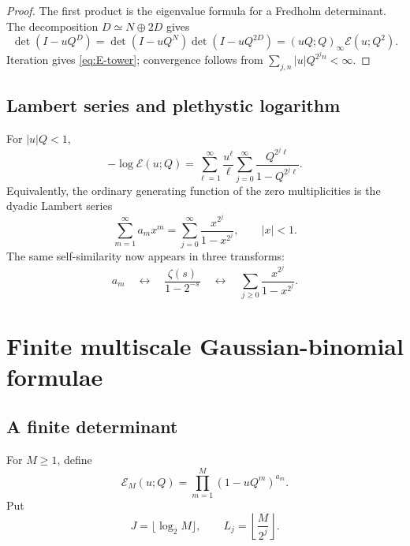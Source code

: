 \documentclass[11pt,oneside]{article}
\numberwithin{equation}{section}
\theoremstyle{plain}
\theoremstyle{definition}
\theoremstyle{remark}
\newcommand{\Ecal}{\mathscr E}
\begin{document}
\begin{proof}
The first product is the eigenvalue formula for a Fredholm determinant.  The decomposition $D\simeq N\oplus2D$ gives
\[
 \det(I-uQ^D)=\det(I-uQ^N)\det(I-uQ^{2D})
 =(uQ;Q)_\infty\Ecal(u;Q^2).
\]
Iteration gives \cref{eq:E-tower}; convergence follows from $\sum_{j,n}|u|Q^{2^jn}<\infty$.
\end{proof}

\subsection{Lambert series and plethystic logarithm}

For $|u|Q<1$,
\begin{equation}\label{eq:E-log}
 -\log\Ecal(u;Q)
 =\sum_{\ell=1}^{\infty}\frac{u^\ell}{\ell}
 \sum_{j=0}^{\infty}\frac{Q^{2^j\ell}}{1-Q^{2^j\ell}}.
\end{equation}
Equivalently, the ordinary generating function of the zero multiplicities is the dyadic Lambert series
\begin{equation}\label{eq:a-ogf}
 \boxed{\ \sum_{m=1}^{\infty}a_mx^m
 =\sum_{j=0}^{\infty}\frac{x^{2^j}}{1-x^{2^j}},\qquad |x|<1.\ }
\end{equation}
The same self-similarity now appears in three transforms:
\[
 a_m\quad\longleftrightarrow\quad
 \frac{\zeta(s)}{1-2^{-s}}
 \quad\longleftrightarrow\quad
 \sum_{j\ge0}\frac{x^{2^j}}{1-x^{2^j}}.
\]

\section{Finite multiscale Gaussian-binomial formulae}

\subsection{A finite determinant}

For $M\ge1$, define
\begin{equation}\label{eq:EM}
 \Ecal_M(u;Q)=\prod_{m=1}^{M}(1-uQ^m)^{a_m}.
\end{equation}
Put
\[
 J=\lfloor\log_2M\rfloor,
 \qquad
 L_j=\left\lfloor\frac{M}{2^j}\right\rfloor.
\]
\end{document}
